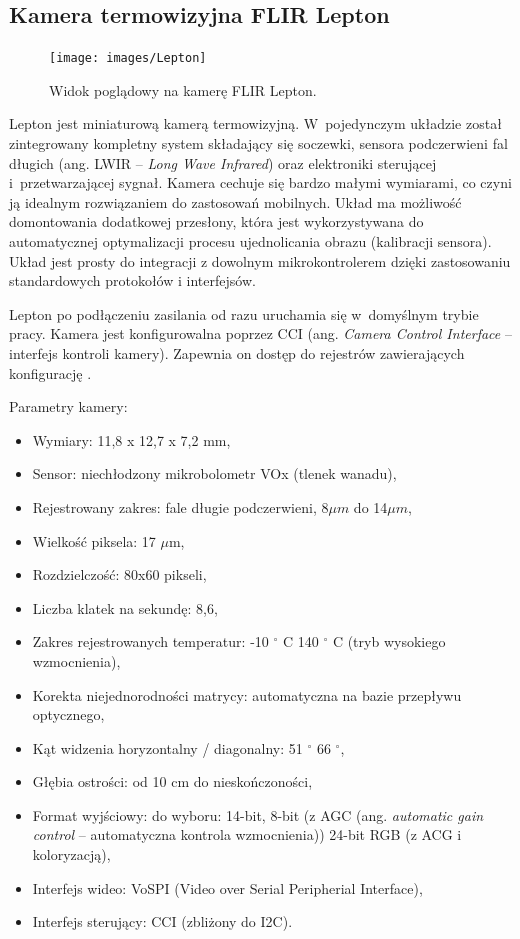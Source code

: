 
\subsection{Kamera termowizyjna FLIR Lepton}
\begin{figure}[h]
\centering
\texttt{[image: images/Lepton]}
\caption{Widok poglądowy na kamerę FLIR Lepton.}
\label{fig:lepton}
\end{figure}

Lepton jest miniaturową kamerą termowizyjną. 
W~pojedynczym układzie został zintegrowany kompletny system składający się soczewki, sensora podczerwieni fal długich (ang. LWIR -- \textit{Long Wave Infrared}) oraz elektroniki sterującej i~przetwarzającej sygnał.
Kamera cechuje się bardzo małymi wymiarami, co czyni ją idealnym rozwiązaniem do zastosowań mobilnych.
Układ ma możliwość domontowania dodatkowej przesłony, która jest wykorzystywana do automatycznej optymalizacji procesu ujednolicania obrazu (kalibracji sensora).
Układ jest prosty do integracji z dowolnym mikrokontrolerem dzięki zastosowaniu standardowych protokołów i interfejsów. 

Lepton po podłączeniu zasilania od razu uruchamia się w~domyślnym trybie pracy. 
Kamera jest konfigurowalna poprzez CCI (ang. \textit{Camera Control Interface} – interfejs kontroli kamery).
Zapewnia on dostęp do rejestrów zawierających konfigurację \cite{lepton}. 

Parametry kamery:
\begin{itemize}
\item Wymiary: 11,8 x 12,7 x 7,2 mm, 
\item Sensor: niechłodzony mikrobolometr VOx (tlenek wanadu),
\item Rejestrowany zakres: fale długie podczerwieni, 8$\mu m$ do 14$\mu m$,
\item Wielkość piksela: 17 $\mu$m,
\item Rozdzielczość: 80x60 pikseli,
\item Liczba klatek na sekundę: 8,6,  
\item Zakres rejestrowanych temperatur: -10  $^\circ$  C 140  $^\circ$  C (tryb wysokiego wzmocnienia),
\item Korekta niejednorodności matrycy: automatyczna na bazie przepływu optycznego, 
\item Kąt widzenia horyzontalny / diagonalny: 51 $^\circ$  66 $^\circ$,
\item Głębia ostrości: od 10 cm do nieskończoności,
\item Format wyjściowy: do wyboru: 14-bit, 8-bit (z AGC (ang. \textit{automatic gain control} -- automatyczna kontrola wzmocnienia)) 24-bit RGB (z ACG i koloryzacją),
\item Interfejs wideo: VoSPI (Video over Serial Peripherial Interface),
\item Interfejs sterujący: CCI (zbliżony do I2C).
\end{itemize}


